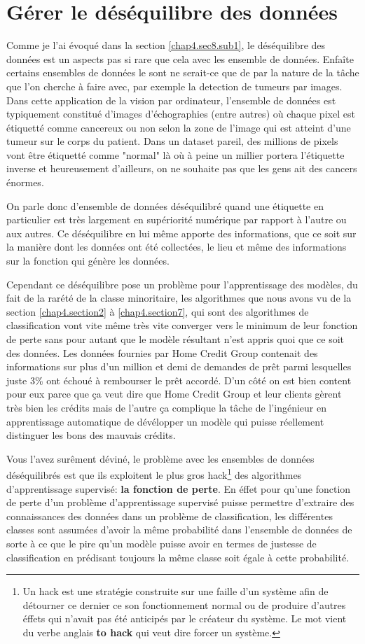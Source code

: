 \section{Gérer le déséquilibre des données}
\label{chap4.section9}
Comme je l'ai évoqué dans la section \ref{chap4.sec8.sub1}, le déséquilibre des données est un aspects pas si rare que cela avec les ensemble de données. Enfaîte certains ensembles de données le sont ne serait-ce que de par la nature de la tâche que l'on cherche à faire avec, par exemple la detection de tumeurs par images. Dans cette application de la vision par ordinateur, l'ensemble de données est typiquement constitué d'images d'échographies (entre autres) où chaque pixel est étiquetté comme cancereux ou non selon la zone de l'image qui est atteint d'une tumeur sur le corps du patient. Dans un dataset pareil, des millions de pixels vont être étiquetté comme "normal" là où à peine un millier portera l'étiquette inverse et heureusement d'ailleurs, on ne souhaite pas que les gens ait des cancers énormes.

On parle donc d'ensemble de données déséquilibré quand une étiquette en particulier est très largement en supériorité numérique par rapport à l'autre ou aux autres. Ce déséquilibre en lui même apporte des informations, que ce soit sur la manière dont les données ont été collectées, le lieu et même des informations sur la fonction qui génère les données.

Cependant ce déséquilibre pose un problème pour l'apprentissage des modèles, du fait de la rarété de la classe minoritaire, les algorithmes que nous avons vu de la section \ref{chap4.section2} à \ref{chap4.section7}, qui sont des algorithmes de classification vont vite même très vite converger vers le minimum de leur fonction de perte sans pour autant que le modèle résultant n'est appris quoi que ce soit des données. Les données fournies par Home Credit Group contenait des informations sur plus d'un million et demi de demandes de prêt parmi lesquelles juste 3\% ont échoué à rembourser le prêt accordé. D'un côté on est bien content pour eux parce que ça veut dire que Home Credit Group et leur clients gèrent très bien les crédits mais de l'autre ça complique la tâche de l'ingénieur en apprentissage automatique de dévélopper un modèle qui puisse réellement distinguer les bons des mauvais crédits.

Vous l'avez surêment déviné, le problème avec les ensembles de données déséquilibrés est que ils exploitent le plus gros hack\footnote{Un hack est une stratégie construite sur une faille d'un système afin de détourner ce dernier ce son fonctionnement normal ou de produire d'autres éffets qui n'avait pas été anticipés par le créateur du système. Le mot vient du verbe anglais \textbf{to hack} qui veut dire forcer un système.} des algorithmes d'apprentissage supervisé: \textbf{la fonction de perte}. En éffet pour qu'une fonction de perte d'un problème d'apprentissage supervisé puisse permettre d'extraire des connaissances des données dans un problème de classification, les différentes classes sont assumées d'avoir la même probabilité dans l'ensemble de données de sorte à ce que le pire qu'un modèle puisse avoir en termes de justesse de classification en prédisant toujours la même classe soit égale à cette probabilité.

